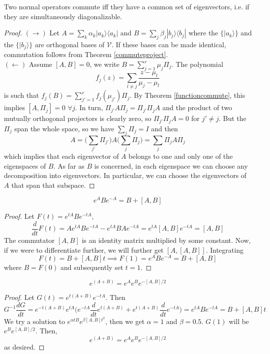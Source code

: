 \documentclass[a4paper]{article}
\begin{document}
\begin{thm}
Two normal operators commute iff they have a common set of eigenvectors, i.e. if they are simultaneously diagonalizable.
\end{thm}
\begin{proof}
$(\rightarrow)$ Let $A=\sum_k\alpha_k|a_k\rangle\langle a_k|$ and $B=\sum_j\beta_j|b_j\rangle\langle b_j|$ where the $\{|a_k\rangle\}$ and the $\{|b_j\rangle\}$ are orthogonal bases of $\mathcal{V}$. If these bases can be made identical, commutation follows from Theorem \ref{commuteproject}.\\[5pt]
$(\leftarrow)$ Assume $[A,B]=0$, we write $B=\sum_{j=1}^r\mu_j\Pi_j$. The polynomial
$$f_j(z)=\sum_{l\neq j}\frac{z-\mu_l}{\mu_j-\mu_l}$$
is such that $f_j(B)=\sum_{j'=1}^rf_j(\mu_{j'})\Pi_j$. By Theorem \ref{functioncommute}, this implies $[A,\Pi_j]=0$ $\forall j$. In turn, $\Pi_{j'}A\Pi_j=\Pi_{j'}\Pi_jA$ and the product of two mutually orthogonal projectors is clearly zero, so $\Pi_{j'}\Pi_jA=0$ for $j'\neq j$. But the $\Pi_j$ span the whole space, so we have $\sum_j\Pi_j=I$ and then
$$A=\bigg(\sum_{j'}\Pi_{j'}\bigg)A\bigg(\sum_j\Pi_j\bigg)=\sum_j\Pi_jA\Pi_j$$
which implies that each eigenvector of $A$ belongs to one and only one of the eigenspaces of $B$. As far as $B$ is concerned, in each eigenspace we can choose any decomposition into eigenvectors. In particular, we can choose the eigenvectors of $A$ that span that subspace.
\end{proof}
\begin{thm}
$$e^ABe^{-A}=B+[A,B]$$
\end{thm}
\begin{proof}
Let $F(t)=e^{tA}Be^{-tA}$, 
$$\frac{d}{dt}F(t)=Ae^{tA}Be^{-tA}-e^{tA}BAe^{-tA}=e^{tA}[A,B]e^{-tA}=[A,B]$$
The commutator $[A,B]$ is an identity matrix multiplied by some constant. Now, if we were to differentiate further, we will further get $[A,[A,B]]$. Integrating
$$F(t)=B+[A,B]t\implies F(1)=e^ABe^{-A}=B+[A,B]$$
where $B=F(0)$ and subsequently set $t=1$.
\end{proof}
\begin{cor}
$$e^{(A+B)}=e^Ae^Be^{-[A,B]/2}$$
\end{cor}
\begin{proof}
Let $G(t)=e^{t(A+B)}e^{-tA}$. Then
$$G^{-1}\frac{dG}{dt}=e^{-t(A+B)}e^{tA}\bigg(e^{-tA}\frac{d}{dt}e^{t(A+B)}+e^{t(A+B)}\frac{d}{dt}e^{-tA}\bigg)=e^{tA}Be^{-tA}=B+[A,B]t$$
We try a solution to $e^{\alpha tB}e^{\beta[A,B]t^2}$, then we get $\alpha=1$ and $\beta=0.5$. $G(1)$ will be $e^Be^{[A,B]/2}$. Then, 
$$e^{(A+B)}=e^Ae^Be^{-[A,B]/2}$$
as desired.
\end{proof}
\newpage
\end{document}
